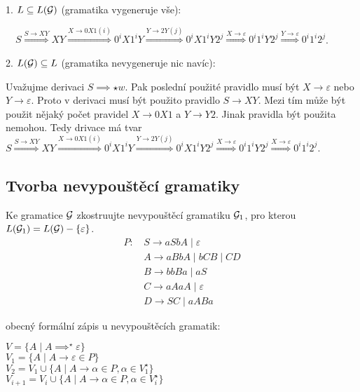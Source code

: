 1. $L \subseteq L(\mathcal{G})$ (gramatika vygeneruje vše):

$\quad S \stackrel{S \rightarrow XY}{\Longrightarrow} XY \stackrel{X \rightarrow 0X1 (i)}{\Longrightarrow} 0^iX1^iY
\stackrel{Y \rightarrow 2Y(j)}{\Longrightarrow} 0^iX1^iY2^j \stackrel{X \rightarrow \varepsilon}{\Longrightarrow}
0^i1^iY2^j\stackrel{Y \rightarrow \varepsilon}{\Longrightarrow} 0^i1^i2^j $.

2. $L(\mathcal{G}) \subseteq L$ (gramatika nevygeneruje nic navíc):

Uvažujme derivaci $S \implies\star w$. Pak poslední použité pravidlo musí být $X \rightarrow \varepsilon$ nebo
$Y \rightarrow \varepsilon$. Proto v derivaci musí být použito pravidlo $S \rightarrow XY$. Mezi tím může být použit
nějaký počet pravidel $X \rightarrow 0X1$ a $Y \rightarrow Y2$. Jinak pravidla být použita nemohou. Tedy drivace má tvar
$ S \stackrel{S \rightarrow XY}{\Longrightarrow} XY \stackrel{X \rightarrow 0X1 (i)}{\Longrightarrow} 0^iX1^iY
\stackrel{Y \rightarrow 2Y(j)}{\Longrightarrow} 0^iX1^iY2^j \stackrel{X \rightarrow \varepsilon}{\Longrightarrow}
0^i1^iY2^j\stackrel{X \rightarrow \varepsilon}{\Longrightarrow} 0^i1^i2^j $.

\subsection{Tvorba nevypouštěcí gramatiky}
Ke gramatice $\mathcal{G}$ zkostruujte nevypouštěcí gramatiku $\mathcal{G}_1$, pro kterou $L(\mathcal{G}_1) = L(\mathcal{G}) - \{\varepsilon\}$.
    \begin{align*}
        P\text{: } & S \rightarrow aSbA \mid \varepsilon \\
           & A \rightarrow aBbA \mid bCB \mid CD \\
           & B \rightarrow bbBa \mid aS \\
           & C \rightarrow aAaA \mid \varepsilon \\
           & D \rightarrow SC \mid aABa
    \end{align*}

obecný formální zápis u nevypouštěcích gramatik:

$V = \{A \mid A \implies^{\star} \varepsilon \}$\\
$V_1 = \{A \mid A \rightarrow \varepsilon \in P\}$\\
$V_2 = V_1 \cup \{A \mid A \rightarrow \alpha \in P, \alpha \in V_1^{\star}\}$\\
$V_{i+1} = V_i \cup \{A \mid A \rightarrow \alpha \in P, \alpha \in V_i^{\star}\}$\\

